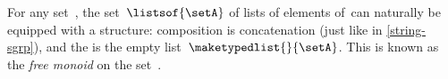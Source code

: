 \begin{example}
    \label{exa:string-monoid}
    For any set~\setA, the set~$\listsof{\setA}$ of lists of elements of~\setA can naturally be equipped with a  structure: composition is concatenation (just like in \cref{string-sgrp}), and the  is the empty list~$\maketypedlist{}{\setA}$.
    This  is known as the \emph{free monoid} on the set~\setA.
\end{example}

%
%
%
%

